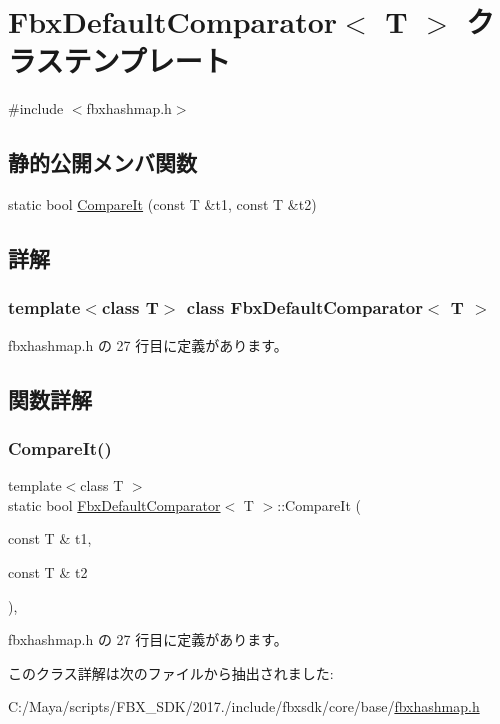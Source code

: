\hypertarget{class_fbx_default_comparator}{}\section{Fbx\+Default\+Comparator$<$ T $>$ クラステンプレート}
\label{class_fbx_default_comparator}


{\ttfamily \#include $<$fbxhashmap.\+h$>$}

\subsection*{静的公開メンバ関数}
\begin{DoxyCompactItemize}
\item 
static bool \hyperlink{class_fbx_default_comparator_a8f36d1cd3e8a9a39ca997f18ac44f929}{Compare\+It} (const T \&t1, const T \&t2)
\end{DoxyCompactItemize}


\subsection{詳解}
\subsubsection*{template$<$class T$>$\newline
class Fbx\+Default\+Comparator$<$ T $>$}



 fbxhashmap.\+h の 27 行目に定義があります。



\subsection{関数詳解}
\mbox{\label{class_fbx_default_comparator_a8f36d1cd3e8a9a39ca997f18ac44f929}} 
\subsubsection{\texorpdfstring{Compare\+It()}{CompareIt()}}
{\footnotesize\ttfamily template$<$class T $>$ \\
static bool \hyperlink{class_fbx_default_comparator}{Fbx\+Default\+Comparator}$<$ T $>$\+::Compare\+It (\begin{DoxyParamCaption}\item[{const T \&}]{t1,  }\item[{const T \&}]{t2 }\end{DoxyParamCaption})\hspace{0.3cm}{\ttfamily [inline]}, {\ttfamily [static]}}



 fbxhashmap.\+h の 27 行目に定義があります。



このクラス詳解は次のファイルから抽出されました\+:\begin{DoxyCompactItemize}
\item 
C\+:/\+Maya/scripts/\+F\+B\+X\+\_\+\+S\+D\+K/2017./include/fbxsdk/core/base/\hyperlink{fbxhashmap_8h}{fbxhashmap.\+h}\end{DoxyCompactItemize}
